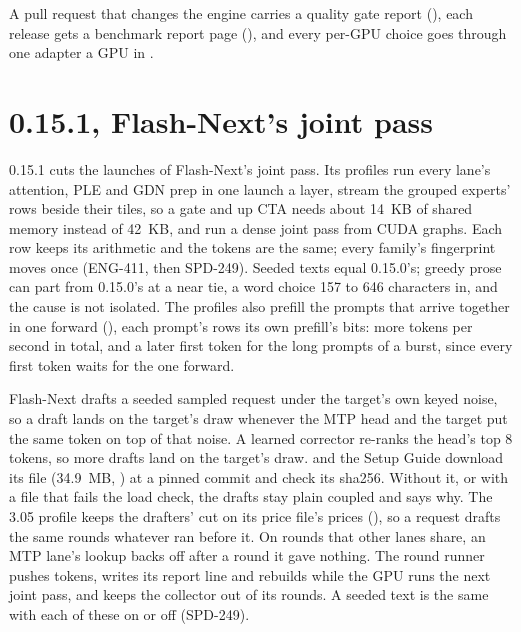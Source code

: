 A pull request that changes the engine carries a quality gate report (), each release gets a benchmark report page (), and every per-GPU choice goes through one adapter a GPU in .

\section{0.15.1, Flash-Next's joint pass}\label{sec:changelog-0151}

0.15.1 cuts the launches of Flash-Next's joint pass. Its profiles run every lane's attention, PLE and GDN prep in one launch a layer, stream the grouped experts' rows beside their tiles, so a gate and up CTA needs about 14~KB of shared memory instead of 42~KB, and run a dense joint pass from CUDA graphs. Each row keeps its arithmetic and the tokens are the same; every family's fingerprint moves once (ENG-411, then SPD-249). Seeded texts equal 0.15.0's; greedy prose can part from 0.15.0's at a near tie, a word choice 157 to 646 characters in, and the cause is not isolated. The profiles also prefill the prompts that arrive together in one forward (), each prompt's rows its own prefill's bits: more tokens per second in total, and a later first token for the long prompts of a burst, since every first token waits for the one forward.

Flash-Next drafts a seeded sampled request under the target's own keyed noise, so a draft lands on the target's draw whenever the MTP head and the target put the same token on top of that noise. A learned corrector re-ranks the head's top 8 tokens, so more drafts land on the target's draw.  and the Setup Guide download its file (34.9~MB, ) at a pinned commit and check its sha256. Without it, or with a file that fails the load check, the drafts stay plain coupled and  says why. The 3.05 profile keeps the drafters' cut on its price file's prices (), so a request drafts the same rounds whatever ran before it. On rounds that other lanes share, an MTP lane's lookup backs off after a round it gave nothing. The round runner pushes tokens, writes its report line and rebuilds  while the GPU runs the next joint pass, and keeps the collector out of its rounds. A seeded text is the same with each of these on or off (SPD-249).

